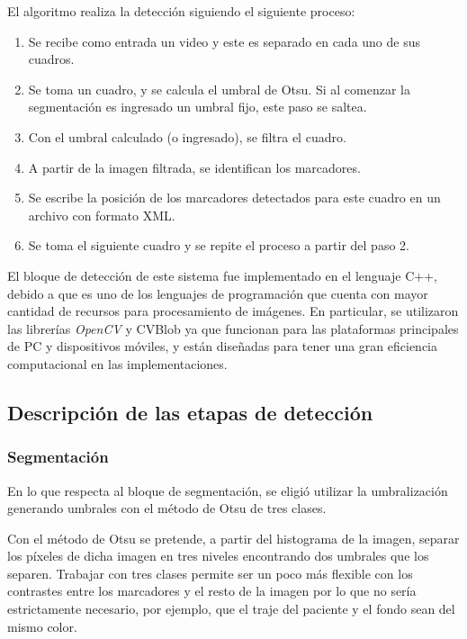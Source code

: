El algoritmo realiza la detección siguiendo el siguiente proceso:

\begin{enumerate}
  \item Se recibe como entrada un video y este es separado en cada uno de sus cuadros.
  \item Se toma un cuadro, y se calcula el umbral de Otsu. Si al comenzar la segmentación es ingresado un umbral fijo, este paso se saltea.
  \item Con el umbral calculado (o ingresado), se filtra el cuadro.
  \item A partir de la imagen filtrada, se identifican los marcadores.
  \item Se escribe la posición de los marcadores detectados para este cuadro en un archivo con formato XML.
  \item Se toma el siguiente cuadro y se repite el proceso a partir del paso 2.
\end{enumerate}

El bloque de detección de este sistema fue implementado en el lenguaje C++, debido a que es uno de los lenguajes de programación que cuenta con mayor cantidad de recursos para procesamiento de imágenes. En particular, se utilizaron las librerías \emph{OpenCV} \cite{opencv} y CVBlob \cite{cvblob} ya que funcionan para las plataformas principales de PC y dispositivos móviles, y están diseñadas para tener una gran eficiencia computacional en las implementaciones.

\subsection{Descripción de las etapas de detección}
\subsubsection{Segmentación}
En lo que respecta al bloque de segmentación, se eligió utilizar la umbralización generando umbrales con el método de Otsu\cite{otsu} de tres clases.

Con el método de Otsu \cite{otsu} se pretende, a partir del histograma de la imagen, separar los píxeles de dicha imagen en tres niveles encontrando dos umbrales que los separen. Trabajar con tres clases permite ser un poco más flexible con los contrastes entre los marcadores y el resto de la imagen por lo que no sería estrictamente necesario, por ejemplo, que el traje del paciente y el fondo sean del mismo color.

